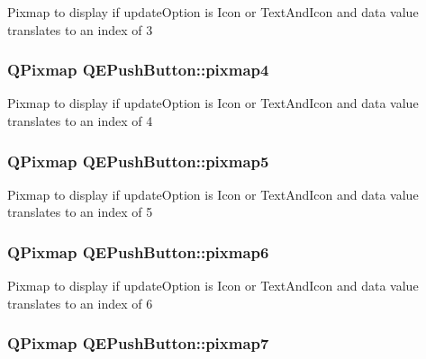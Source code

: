 Pixmap to display if updateOption is Icon or TextAndIcon and data value translates to an index of 3 \hypertarget{classQEPushButton_a032990ba96ae30e11e314258a1a6d5b2}{
\subsubsection[{pixmap4}]{\setlength{\rightskip}{0pt plus 5cm}QPixmap QEPushButton::pixmap4}}
\label{classQEPushButton_a032990ba96ae30e11e314258a1a6d5b2}
Pixmap to display if updateOption is Icon or TextAndIcon and data value translates to an index of 4 \hypertarget{classQEPushButton_a9a354f3ca109fd25a5dcfd5d6c91119e}{
\subsubsection[{pixmap5}]{\setlength{\rightskip}{0pt plus 5cm}QPixmap QEPushButton::pixmap5}}
\label{classQEPushButton_a9a354f3ca109fd25a5dcfd5d6c91119e}
Pixmap to display if updateOption is Icon or TextAndIcon and data value translates to an index of 5 \hypertarget{classQEPushButton_a8fcaaa8f5e05c36feb340da2f9661dc5}{
\subsubsection[{pixmap6}]{\setlength{\rightskip}{0pt plus 5cm}QPixmap QEPushButton::pixmap6}}
\label{classQEPushButton_a8fcaaa8f5e05c36feb340da2f9661dc5}
Pixmap to display if updateOption is Icon or TextAndIcon and data value translates to an index of 6 \hypertarget{classQEPushButton_a4d04d0e65d8128bb377469261647b436}{
\subsubsection[{pixmap7}]{\setlength{\rightskip}{0pt plus 5cm}QPixmap QEPushButton::pixmap7}}
